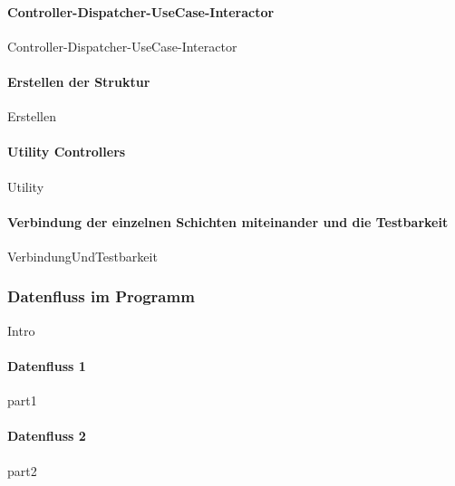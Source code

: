 \documentclass{article}
\begin{document}
            \paragraph{Controller-Dispatcher-UseCase-Interactor} 
            \label{Controller-Dispatcher-UseCase-Interactor}
                {Controller-Dispatcher-UseCase-Interactor}
    
            \newpage
            \paragraph{Erstellen der Struktur}
                {Erstellen}
   
            \paragraph{Utility Controllers}
            \label{kap:utilityControllers}
                {Utility}
   
            \paragraph{Verbindung der einzelnen Schichten miteinander und die Testbarkeit}
                {VerbindungUndTestbarkeit}

           
               
        \newpage
        \subsubsection{Datenfluss im Programm}
        \label{kap:Dataflow}
            {Intro}
           
            \newpage
            \paragraph{Datenfluss \textbf{1}}
            {part1}
            \newpage
            \paragraph{Datenfluss \textbf{2}}
            {part2}
            \newpage
\end{document}
